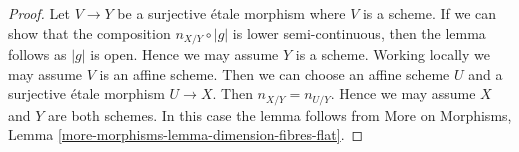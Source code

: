 \documentclass[10pt,a4paper]{amsart}
\theoremstyle{plain}
\theoremstyle{definition}
\theoremstyle{remark}
\numberwithin{equation}{subsection}
\begin{document}
\begin{proof}
Let $V \to Y$ be a surjective \'etale morphism where $V$ is a scheme.
If we can show that the composition $n_{X/Y} \circ |g|$
is lower semi-continuous, then the lemma follows as $|g|$ is open.
Hence we may assume $Y$ is a scheme.
Working locally we may assume $V$ is an affine scheme.
Then we can choose an affine scheme $U$ and a surjective
\'etale morphism $U \to X$. Then $n_{X/Y} = n_{U/Y}$.
Hence we may assume $X$ and $Y$ are both schemes.
In this case the lemma follows from
More on Morphisms, Lemma \ref{more-morphisms-lemma-dimension-fibres-flat}.
\end{proof}
\end{document}
